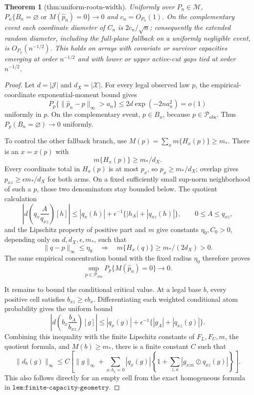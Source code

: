 \documentclass{article}
\newtheorem{theorem}{Theorem}
\begin{document}
\begin{theorem}[thm:uniform-rootn-width]\label{thm:uniform-rootn-width}
Uniformly over \(P_n\in\mathcal M\), \(P_n\{B_n=\varnothing\text{ or }M(\widehat p_n)=0\}\to0\) and \(c_n=O_{P_n}(1)\). On the complementary event each coordinate diameter of \(C_n\) is \(2c_n/\sqrt n\); consequently the extended random diameter, including the full-plane fallback on a uniformly negligible event, is \(O_{P_n}(n^{-1/2})\). This holds on arrays with covariate or survivor capacities emerging at order \(n^{-1/2}\) and with lower or upper active-cut gaps tied at order \(n^{-1/2}\).
\end{theorem}
\begin{proof}
Let \(d=|\mathcal J|\) and \(d_X=|\mathcal X|\).  For every legal observed law \(p\), the empirical-coordinate exponential-moment bound gives
\[
P_p\{\|\widehat p_n-p\|_\infty>a_n\}
\le2d\exp(-2na_n^2)=o(1)
\]
uniformly in \(p\).  On the complementary event, \(p\in B_n\), because \(p\in\mathcal P_{\mathrm{obs}}\).  Thus \(P_p(B_n=\varnothing)\to0\) uniformly.

To control the other fallback branch, use \(M(p)=\sum_xm\{H_x(p)\}\ge m_*\).  There is an \(x=x(p)\) with
\[
m\{H_x(p)\}\ge m_*/d_X.
\]
Every coordinate total in \(H_x(p)\) is at most \(p_x\), so \(p_x\ge m_*/d_X\); overlap gives \(p_{xz}\ge\epsilon m_*/d_X\) for both arms.  On a fixed sufficiently small sup-norm neighborhood of such a \(p\), those two denominators stay bounded below.  The quotient calculation
\[
\left|d\left(q_x\frac{A}{q_{xz}}\right)[h]\right|
\le |q_x(h)|+\epsilon^{-1}\{|h_A|+|q_{xz}(h)|\},
\qquad 0\le A\le q_{xz},
\]
and the Lipschitz property of positive part and \(m\) give constants \(\eta_0,C_0>0\), depending only on \(d,d_X,\epsilon,m_*\), such that
\[
\|q-p\|_\infty\le\eta_0
\quad\Longrightarrow\quad
m\{H_x(q)\}\ge m_*/(2d_X)>0.
\]
The same empirical concentration bound with the fixed radius \(\eta_0\) therefore proves
\[
\sup_{p\in\mathcal P_{\mathrm{obs}}}P_p\{M(\widehat p_n)=0\}\longrightarrow0.
\]

It remains to bound the conditional critical value.  At a legal base \(b\), every positive cell satisfies \(b_{xz}\ge\epsilon b_x\).  Differentiating each weighted conditional atom probability gives the uniform bound
\[
\left|d\left(b_x\frac{b_A}{b_{xz}}\right)[g]\right|
\le |q_x(g)|+\epsilon^{-1}\{|g_A|+|q_{xz}(g)|\}.
\]
Combining this inequality with the finite Lipschitz constants of \(F_L,F_U,m\), the quotient formula, and \(M(b)\ge m_*\), there is a finite constant \(C\) such that
\[
\|d_b(g)\|_\infty
\le C\left[\|g\|_\infty+
\sum_{x:b_x=0}|q_x(g)|
\left\{1+\sum_{z,a}|g_{xza}\oslash q_{xz}(g)|\right\}\right].
\tag{1}
\]
This also follows directly for an empty cell from the exact homogeneous formula in \(\texttt{lem:finite-capacity-geometry}\).


\end{proof}
\end{document}
